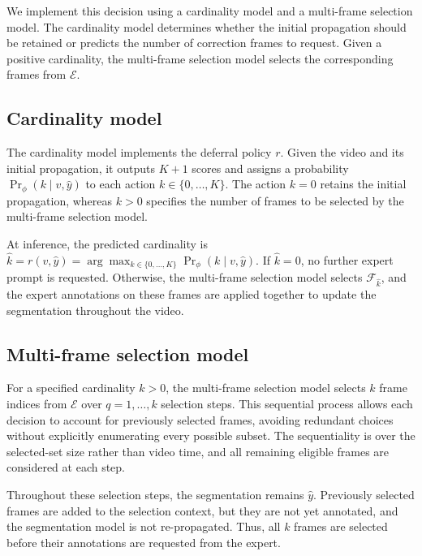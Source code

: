 We implement this decision using a cardinality model and a multi-frame
selection model. The cardinality model determines whether the initial
propagation should be retained or predicts the number of correction frames
to request. Given a positive cardinality, the multi-frame selection model
selects the corresponding frames from \(\mathcal{E}\).



\subsection{Cardinality model}
\label{sec:cardinality_model}

The cardinality model implements the deferral policy \(r\). Given the video
and its initial propagation, it outputs \(K+1\) scores and assigns a
probability
\(
\Pr_{\phi}(k\mid v,\widehat{y})
\)
to each action \(k\in\{0,\ldots,K\}\). The action \(k=0\) retains the
initial propagation, whereas \(k>0\) specifies the number of frames to be
selected by the multi-frame selection model.

At inference, the predicted cardinality is
\(
\widehat{k}
=
r(v,\widehat{y})
=
\arg\max_{k\in\{0,\ldots,K\}}
\Pr_{\phi}(k\mid v,\widehat{y}).
\)
If \(\widehat{k}=0\), no further expert prompt is requested. Otherwise,
the multi-frame selection model selects
\(\mathcal{F}_{\widehat{k}}\), and the expert annotations on these frames
are applied together to update the segmentation throughout the video.

\subsection{Multi-frame selection model}
\label{sec:multi_frame_selector}

For a specified cardinality \(k>0\), the multi-frame selection model selects
\(k\) frame indices from \(\mathcal{E}\) over \(q=1,\ldots,k\) selection
steps. This sequential process allows each decision to account for previously
selected frames, avoiding redundant choices without explicitly enumerating
every possible subset. The sequentiality is over the selected-set size rather
than video time, and all remaining eligible frames are considered at each step.

Throughout these selection steps, the segmentation remains
\(\widehat{y}\). Previously selected frames are added to the selection
context, but they are not yet annotated, and the segmentation model is not
re-propagated. Thus, all \(k\) frames are selected before their annotations
are requested from the expert.

